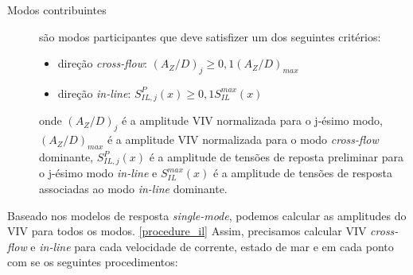 \begin{description}
	\item [Modos contribuintes] são modos participantes que deve satisfizer um dos seguintes critérios:
    
        \begin{itemize}
    	\item direção \textit{cross-flow}: $(A_Z/D)_j \geq 0,1(A_Z/D)_\mathit{max}$
    
        \item direção \textit{in-line}: $S_{\mathit{IL}, \mathit{j}}^{P}(x) \geq 0,1 S_\mathit{IL}^\mathit{max}(x)$
        \end{itemize}

	onde $(A_Z/D)_j$ é a amplitude VIV normalizada para o j-ésimo modo, $(A_Z/D)_\mathit{max}$ é a amplitude VIV normalizada para o modo \textit{cross-flow}  dominante, $S_{\mathit{IL}, \mathit{j}}^{P}(x)$ é a amplitude de tensões de reposta preliminar para o j-ésimo modo \textit{in-line} e $S_\mathit{IL}^\mathit{max}(x)$ é a amplitude de tensões de resposta associadas ao modo \textit{in-line} dominante.

\end{description}

Baseado nos modelos de resposta \textit{single-mode}, podemos calcular as amplitudes do VIV para todos os modos. \ref{procedure_il}
Assim, precisamos calcular VIV \textit{cross-flow} e \textit{in-line} para cada velocidade de corrente, estado de mar e em cada ponto com se os seguintes procedimentos:

